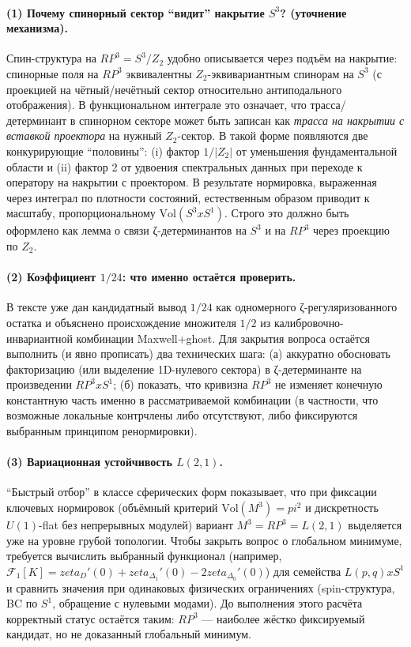 \documentclass[12pt]{article}
\def\mathbb#1{#1}%
\def\pi{pi}%
\def\times{x}%
\def\zeta{zeta}%
\begin{document}
\paragraph{(1) Почему спинорный сектор ``видит'' накрытие $S^3$? (уточнение механизма).}
Спин-структура на $\mathbb{RP}^3=S^3/\mathbb{Z}_2$ удобно описывается через подъём на накрытие: спинорные поля на $\mathbb{RP}^3$ эквивалентны $\mathbb{Z}_2$-эквивариантным спинорам на $S^3$ (с проекцией на чётный/нечётный сектор относительно антиподального отображения).
В функциональном интеграле это означает, что трасса/детерминант в спинорном секторе может быть записан как
\emph{трасса на накрытии с вставкой проектора} на нужный $\mathbb{Z}_2$-сектор.
В такой форме появляются две конкурирующие ``половины'': (i) фактор $1/|\mathbb{Z}_2|$ от уменьшения фундаментальной области и (ii) фактор 2 от удвоения спектральных данных при переходе к оператору на накрытии с проектором.
В результате нормировка, выраженная через интеграл по плотности состояний, естественным образом приводит к масштабу, пропорциональному $\mathrm{Vol}(S^3\times S^1)$.
Строго это должно быть оформлено как лемма о связи ζ-детерминантов на $S^3$ и на $\mathbb{RP}^3$ через проекцию по $\mathbb{Z}_2$.

\paragraph{(2) Коэффициент $1/24$: что именно остаётся проверить.}
В тексте уже дан кандидатный вывод $1/24$ как одномерного ζ-регуляризованного остатка и объяснено происхождение множителя $1/2$ из калибровочно-инвариантной комбинации Maxwell+ghost.
Для закрытия вопроса остаётся выполнить (и явно прописать) два технических шага:
(а) аккуратно обосновать факторизацию (или выделение 1D-нулевого сектора) в ζ-детерминанте на произведении $\mathbb{RP}^3\times S^1$;
(б) показать, что кривизна $\mathbb{RP}^3$ не изменяет конечную константную часть именно в рассматриваемой комбинации (в частности, что возможные локальные контрчлены либо отсутствуют, либо фиксируются выбранным принципом ренормировки).

\paragraph{(3) Вариационная устойчивость $L(2,1)$.}
``Быстрый отбор'' в классе сферических форм показывает, что при фиксации ключевых нормировок (объёмный критерий $\mathrm{Vol}(M^3)=\pi^2$ и дискретность $U(1)$-flat без непрерывных модулей) вариант $M^3=\mathbb{RP}^3=L(2,1)$ выделяется уже на уровне грубой топологии.
Чтобы закрыть вопрос о глобальном минимуме, требуется вычислить выбранный функционал (например, $\mathcal{F}_1[K]=\zeta_{D}'(0)+\zeta_{\Delta_1}'(0)-2\zeta_{\Delta_0}'(0)$) для семейства $L(p,q)\times S^1$ и сравнить значения при одинаковых физических ограничениях (spin-структура, BC по $S^1$, обращение с нулевыми модами).
До выполнения этого расчёта корректный статус остаётся таким: $\mathbb{RP}^3$ --- наиболее жёстко фиксируемый кандидат, но не доказанный глобальный минимум.
\end{document}
